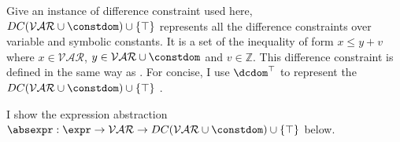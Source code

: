 Give an instance of difference constraint used here,
$DC(\mathcal{VAR}  \cup \constdom) \cup \{\top\}$ represents all the difference constraints over 
variable and symbolic constants. 
It is a set of the inequality of form $x \leq y + v$ where $x \in \mathcal{VAR} $, 
$y \in \mathcal{VAR}  \cup \constdom$ and $v \in \mathbb{Z}$. 
This difference constraint is defined in the same way as
\cite{sinn2017complexity}. For concise, I use $\dcdom^{\top}$ to represent the $DC(\mathcal{VAR}  \cup \constdom) \cup \{\top\}$ .


 I show the expression abstraction $\absexpr : \expr \to \mathcal{VAR} \to DC(\mathcal{VAR}  \cup \constdom) \cup \{\top\} $ below.





